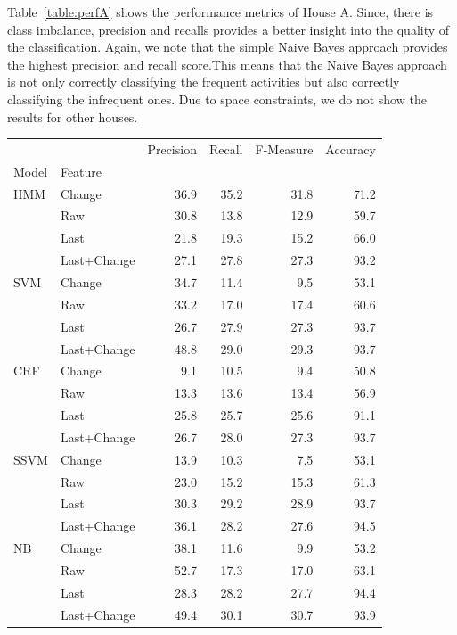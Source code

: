 Table~\ref{table:perfA} shows the performance metrics of House A. Since, there is class imbalance, precision and recalls provides a better insight into the quality of the classification. Again, we note that the simple Naive Bayes approach provides the highest precision and recall score.This means that the Naive Bayes approach is not only correctly classifying the frequent activities but also correctly classifying the infrequent ones. Due to space constraints, we do not show the results for other houses.


\label{table:perfA}
\begin{tabular}{llrrrr}
\toprule
    &        &  Precision &  Recall &  F-Measure &  Accuracy \\
Model & Feature &            &         &            &           \\
\midrule
HMM & Change &       36.9 &    35.2 &       31.8 &      71.2 \\
    & Raw &       30.8 &    13.8 &       12.9 &      59.7 \\
    & Last &       21.8 &    19.3 &       15.2 &      66.0 \\
    & Last+Change &       27.1 &    27.8 &       27.3 &      93.2 \\
SVM & Change &       34.7 &    11.4 &        9.5 &      53.1 \\
    & Raw &       33.2 &    17.0 &       17.4 &      60.6 \\
    & Last &       26.7 &    27.9 &       27.3 &      93.7 \\
    & Last+Change &       48.8 &    29.0 &       29.3 &      93.7 \\
CRF & Change &        9.1 &    10.5 &        9.4 &      50.8 \\
    & Raw &       13.3 &    13.6 &       13.4 &      56.9 \\
    & Last &       25.8 &    25.7 &       25.6 &      91.1 \\
    & Last+Change &       26.7 &    28.0 &       27.3 &      93.7 \\
SSVM & Change &       13.9 &    10.3 &        7.5 &      53.1 \\
    & Raw &       23.0 &    15.2 &       15.3 &      61.3 \\
    & Last &       30.3 &    29.2 &       28.9 &      93.7 \\
    & Last+Change &       36.1 &    28.2 &       27.6 &      94.5 \\
NB & Change &       38.1 &    11.6 &        9.9 &      53.2 \\
    & Raw &       52.7 &    17.3 &       17.0 &      63.1 \\
    & Last &       28.3 &    28.2 &       27.7 &      94.4 \\
    & Last+Change &       49.4 &    30.1 &       30.7 &      93.9 \\
\bottomrule
\end{tabular}\\

